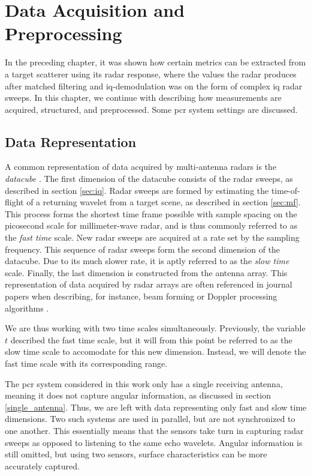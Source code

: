 \chapter{Data Acquisition and Preprocessing}\label{ch:3}

In the preceding chapter, it was shown how certain metrics can be extracted from a target scatterer using its radar response, where the values the radar produces after matched filtering and \gls{iq}-demodulation was on the form of complex \gls{iq} radar sweeps. In this chapter, we continue with describing how measurements are acquired, structured, and preprocessed. Some \gls{pcr} system settings are discussed.

\section{Data Representation}

A common representation of data acquired by multi-antenna radars is the \emph{datacube} \citep{richards_2014}. The first dimension of the datacube consists of the radar sweeps, as described in section \ref{sec:iq}. Radar sweeps are formed by estimating the time-of-flight of a returning wavelet from a target scene, as described in section \ref{sec:mf}. This process forms the shortest time frame possible with sample spacing on the picosecond scale for millimeter-wave radar, and is thus commonly referred to as the \emph{fast time} scale. New radar sweeps are acquired at a rate set by the sampling frequency. This sequence of radar sweeps form the second dimension of the datacube. Due to its much slower rate, it is aptly referred to as the \emph{slow time} scale. Finally, the last dimension is constructed from the antenna array. This representation of data acquired by radar arrays are often referenced in journal papers when describing, for instance, beam forming or Doppler processing algorithms \citep{gentile_donovan_2018}.

We are thus working with two time scales simultaneously. Previously, the variable $t$ described the fast time scale, but it will from this point be referred to as the slow time scale to accomodate for this new dimension. Instead, we will denote the fast time scale with its corresponding range. 

The \gls{pcr} system considered in this work only has a single receiving antenna, meaning it does not capture angular information, as discussed in section \ref{single_antenna}. Thus, we are left with data representing only fast and slow time dimensions. Two such systems are used in parallel, but are not synchronized to one another. This essentially means that the sensors take turn in capturing radar sweeps as opposed to listening to the same echo wavelets. Angular information is still omitted, but using two sensors, surface characteristics can be more accurately captured.

